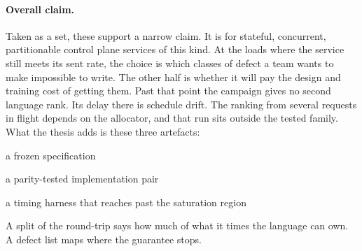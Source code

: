 \documentclass[english,oneside,a4paper,censored,csm,software-track-2020]{HYthesisML}
\begin{document}
\paragraph{Overall claim.}
Taken as a set, these support a narrow claim. It is for stateful, concurrent,
partitionable control plane services of this kind. At the loads where the
service still meets its sent rate, the choice is which classes of defect a
team wants to make impossible to write. The other half is whether it will pay the
design and training cost of getting them. Past that point the campaign gives no second language rank. Its delay there is
schedule drift. The ranking from several requests in flight depends on the
allocator, and that run sits outside the tested family. What the thesis adds is
these three artefacts:
\begin{compactitem}
\item a frozen specification
\item a parity-tested implementation pair
\item a timing harness that reaches past the saturation region
\end{compactitem}
A split of the round-trip says how much of what it times the language can own. A defect
list maps where the guarantee stops.
\end{document}
